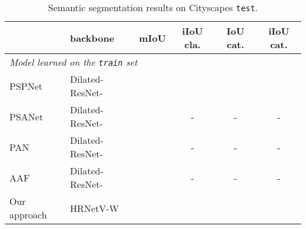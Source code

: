 \documentclass[10pt,twocolumn,letterpaper]{article}
\begin{document}
\renewcommand{\arraystretch}{1.3}
	\setlength{\tabcolsep}{3pt}
	\begin{table}[t]
		\scriptsize
		\centering
		\caption{Semantic segmentation results on Cityscapes \texttt{test}.}
		\label{tab:cityscaperesults}
		\begin{tabular}{l|l|cccc}
			\hline\noalign{\smallskip}
			  & backbone & mIoU  & iIoU cla. & IoU cat. & iIoU cat.\\
			\hline
			
			\hline
			\multicolumn{3}{l}{\emph {Model learned on the \texttt{train} set}}\\
			\hline
			PSPNet~\cite{ZhaoSQWJ17} & Dilated-ResNet- &  &  &   &  \\
			PSANet~\cite{ZhaoZLSLLJ18} & Dilated-ResNet- &  & - & - & - \\
			PAN~\cite{LiXAW18} & Dilated-ResNet- &  & - & - & - \\
			AAF~\cite{KeHLY18} & Dilated-ResNet- &  & - & - & -\\
			\hline
			Our approach & HRNetV-W &  &  &  & \\
			\hline
			

\end{tabular}
\end{table}
\end{document}
